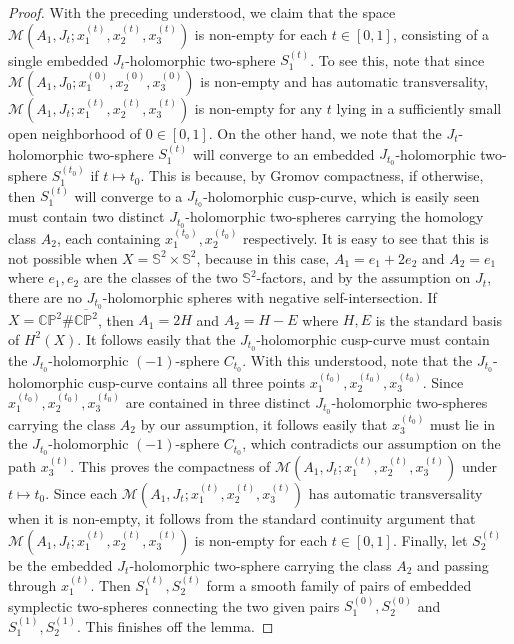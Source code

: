 \documentclass[11pt]{amsart}
\theoremstyle{plain}
\numberwithin{theorem}{section}
\theoremstyle{definition}
\newcommand{\C}{{\mathbb C}}
\renewcommand{\P}{{\mathbb P}}
\newcommand{\s}{{\mathbb S}}
\newcommand{\M}{{\mathcal M}}
\begin{document}
\begin{proof}
With the preceding understood, we claim that the space $\M(A_1,J_t; x_1^{(t)},x_2^{(t)},x_3^{(t)})$ is non-empty for each $t\in [0,1]$, consisting of a single embedded $J_t$-holomorphic two-sphere $S_1^{(t)}$. To see this, note that since $\M(A_1,J_0; x_1^{(0)},x_2^{(0)},x_3^{(0)})$ is non-empty and has automatic transversality, 
$\M(A_1,J_t; x_1^{(t)},x_2^{(t)},x_3^{(t)})$ is non-empty for any $t$ lying in a sufficiently small open neighborhood of $0\in [0,1]$. On the other hand, we note that the $J_t$-holomorphic two-sphere $S_1^{(t)}$ will converge to an embedded $J_{t_0}$-holomorphic two-sphere $S_1^{(t_0)}$ if $t\mapsto t_0$. This is because, by Gromov compactness, if otherwise, then $S_1^{(t)}$ will converge to a $J_{t_0}$-holomorphic cusp-curve, which is easily seen must contain two distinct $J_{t_0}$-holomorphic two-spheres carrying the homology class $A_2$, each containing $x_1^{(t_0)}, x_2^{(t_0)}$ respectively. It is easy to see that this is not possible when $X=\s^2\times \s^2$, because in this case, $A_1=e_1+2e_2$ and $A_2=e_1$ where $e_1,e_2$ are the classes of the two $\s^2$-factors, and by the assumption on $J_t$, there are no $J_{t_0}$-holomorphic spheres with negative self-intersection. If $X=\C\P^2\#\overline{\C\P^2}$, then $A_1=2H$ and $A_2=H-E$ where $H,E$ is the standard basis of $H^2(X)$. It follows easily that the $J_{t_0}$-holomorphic cusp-curve must contain the $J_{t_0}$-holomorphic 
$(-1)$-sphere $C_{t_0}$. With this understood, note that the $J_{t_0}$-holomorphic cusp-curve contains all three points $x_1^{(t_0)},x_2^{(t_0)},x_3^{(t_0)}$. Since $x_1^{(t_0)}, x_2^{(t_0)}, x_3^{(t_0)}$ are contained in three distinct  $J_{t_0}$-holomorphic two-spheres carrying the class $A_2$ by our assumption, it follows easily that $x_3^{(t_0)}$ must lie in the $J_{t_0}$-holomorphic $(-1)$-sphere $C_{t_0}$, which contradicts our assumption on the path $x_3^{(t)}$. This proves the compactness of $\M(A_1,J_t; x_1^{(t)},x_2^{(t)},x_3^{(t)})$ under
$t\mapsto t_0$.
Since each $\M(A_1,J_t; x_1^{(t)},x_2^{(t)},x_3^{(t)})$ has automatic transversality when it is non-empty, it follows from the standard continuity argument that $\M(A_1,J_t; x_1^{(t)},x_2^{(t)},x_3^{(t)})$ is non-empty for each 
$t\in [0,1]$. Finally, let $S_2^{(t)}$ be the embedded $J_t$-holomorphic two-sphere carrying the class $A_2$ and passing through $x_1^{(t)}$. Then $S_1^{(t)},S_2^{(t)}$ form a smooth family of pairs of embedded symplectic 
two-spheres connecting the two given pairs $S_1^{(0)},S_2^{(0)}$ and $S_1^{(1)},S_2^{(1)}$. This finishes off the lemma. 

\end{proof}
\end{document}
